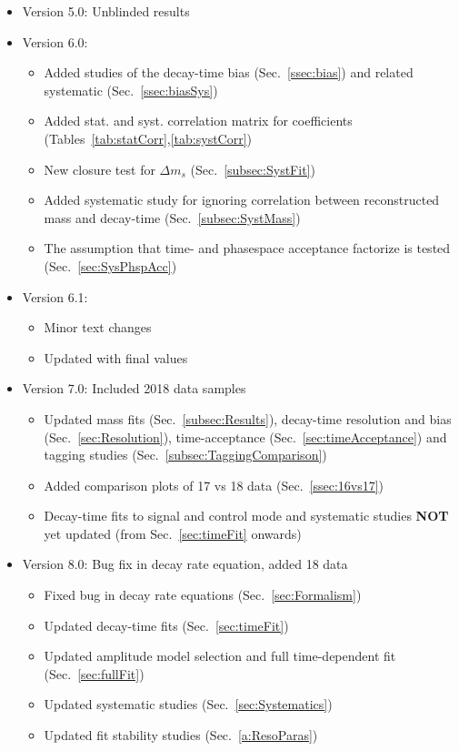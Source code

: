 \begin{itemize}
			\item Version 5.0:  Unblinded results 
			
			\item Version 6.0:  
				\begin{itemize}
					\item Added studies of the decay-time bias (Sec.~\ref{ssec:bias}) and related systematic (Sec.~\ref{ssec:biasSys})
					\item Added stat. and syst. correlation matrix for \CP coefficients  (Tables~\ref{tab:statCorr},\ref{tab:systCorr})
					\item New closure test for $\Delta m_s$ (Sec.~\ref{subsec:SystFit})
					\item Added systematic study for ignoring correlation between reconstructed mass and decay-time (Sec.~\ref{subsec:SystMass})
					\item The assumption that time- and phasespace acceptance factorize is tested (Sec.~\ref{sec:SysPhspAcc})
				\end{itemize}
				
				
			\item Version 6.1:  
				\begin{itemize}
					\item Minor text changes
					\item Updated with final values
				\end{itemize}	

 
			\item Version 7.0:  Included 2018 data samples
				\begin{itemize}
					\item Updated mass fits (Sec.~\ref{subsec:Results}), decay-time resolution and bias (Sec.~\ref{sec:Resolution}), 
					time-acceptance (Sec.~\ref{sec:timeAcceptance}) and tagging studies (Sec.~\ref{subsec:TaggingComparison})
					\item Added comparison plots of 17 vs 18 data (Sec.~\ref{ssec:16vs17}) 
					\item Decay-time fits to signal and control mode and systematic studies \textbf{NOT} yet updated (from Sec.~\ref{sec:timeFit} onwards)
				\end{itemize}	
				
			\item Version 8.0:  Bug fix in decay rate equation, added 18 data
				\begin{itemize}
					\item Fixed bug in decay rate equations (Sec.~\ref{sec:Formalism})
					\item Updated decay-time fits  (Sec.~\ref{sec:timeFit})
					\item Updated amplitude model selection and full time-dependent fit  (Sec.~\ref{sec:fullFit})
					\item Updated systematic studies  (Sec.~\ref{sec:Systematics})
					\item Updated fit stability studies (Sec.~\ref{a:ResoParas})
				\end{itemize}	


\end{itemize}
